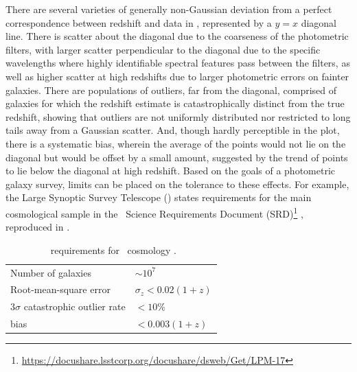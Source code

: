 There are several varieties of generally non-Gaussian deviation from a perfect correspondence between redshift and data in , represented by a $y = x$ diagonal line.
There is scatter about the diagonal due to the coarseness of the photometric filters, with larger scatter perpendicular to the diagonal due to the specific wavelengths where highly identifiable spectral features pass between the filters, as well as higher scatter at high redshifts due to larger photometric errors on fainter galaxies.
There are populations of outliers, far from the diagonal, comprised of galaxies for which the redshift estimate is catastrophically distinct from the true redshift, showing that outliers are not uniformly distributed nor restricted to long tails away from a Gaussian scatter.
And, though hardly perceptible in the plot, there is a systematic bias, wherein the average of the points would not lie on the diagonal but would be offset by a small amount, suggested by the trend of points to lie below the diagonal at high redshift.
Based on the goals of a photometric galaxy survey, limits can be placed on the tolerance to these effects.
For example, the Large Synoptic Survey Telescope (\lsst) states requirements for the main cosmological sample in the \lsst\ Science Requirements Document (SRD)\footnote{\url{https://docushare.lsstcorp.org/docushare/dsweb/Get/LPM-17}} \citep{the_lsst_dark_energy_science_collaboration_lsst_2018}, reproduced in .

\begin{table}
	\begin{center}
		\caption{\Pz\ requirements for \lsst\ cosmology \citep{the_lsst_dark_energy_science_collaboration_lsst_2018}.}
	\begin{tabular}{ll}
		Number of galaxies & $\sim 10^{7}$\\
		Root-mean-square error & $\sigma_z < 0.02 (1 + z)$\\
		$3 \sigma$ catastrophic outlier rate & $< 10\%$\\
		bias & $< 0.003 (1 + z)$
	\end{tabular}
	\end{center}
\end{table}

